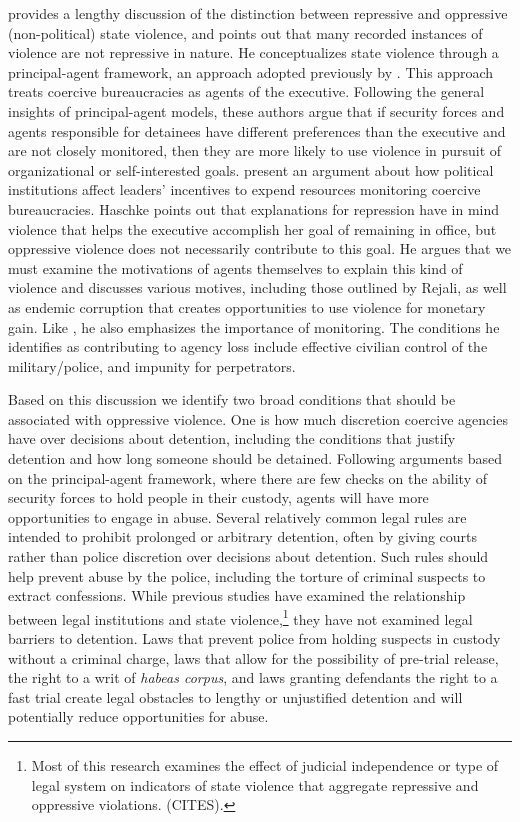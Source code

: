 \documentclass[11pt]{article}
\begin{document}
\citet{Haschke2018} provides a lengthy discussion of the distinction between repressive and oppressive (non-political) state violence, and points out that many recorded instances of violence are not repressive in nature. He conceptualizes state violence through a principal-agent framework, an approach adopted previously by \citet{ConradMoore2010}. This approach treats coercive bureaucracies as agents of the executive. Following the general insights of principal-agent models, these authors argue that if security forces and agents responsible for detainees have different preferences than the executive and are not closely monitored, then they are more likely to use violence in pursuit of organizational or self-interested goals. \citet{ConradMoore2010} present an argument about how political institutions affect leaders' incentives to expend resources monitoring coercive bureaucracies. Haschke points out that explanations for repression have in mind violence that helps the executive accomplish her goal of remaining in office, but oppressive violence does not necessarily contribute to this goal. He argues that we must examine the motivations of agents themselves to explain this kind of violence and discusses various motives, including those outlined by Rejali, as well as endemic corruption that creates opportunities to use violence for monetary gain. Like \citet{ConradMoore}, he also emphasizes the importance of monitoring. The conditions he identifies as contributing to agency loss include effective civilian control of the military/police, and impunity for perpetrators. 

Based on this discussion we identify two broad conditions that should be associated with oppressive violence. One is how much discretion coercive agencies have over decisions about detention, including the conditions that justify detention and how long someone should be detained. Following arguments based on the principal-agent framework, where there are few checks on the ability of security forces to hold people in their custody, agents will have more opportunities to engage in abuse. Several relatively common legal rules are intended to prohibit prolonged or arbitrary detention, often by giving courts rather than police discretion over decisions about detention. Such rules should help prevent abuse by the police, including the torture of criminal suspects to extract confessions. While previous studies have examined the relationship between legal institutions and state violence,\footnote{Most of this research examines the effect of judicial independence or type of legal system on indicators of state violence that aggregate repressive and oppressive violations. (CITES).} they have not examined legal barriers to detention. Laws that prevent police from holding suspects in custody without a criminal charge, laws that allow for the possibility of pre-trial release, the right to a writ of {\em habeas corpus}, and laws granting defendants the right to a fast trial create legal obstacles to lengthy or unjustified detention and will potentially reduce opportunities for abuse. 
\end{document}

